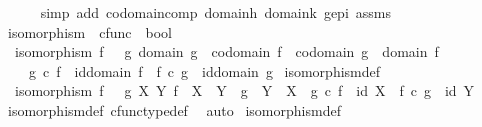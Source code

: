 \begin{isabellebody}
\ \ \ \ \isamarkupfalse%
\ {\isacharparenleft}{\kern0pt}simp\ add{\isacharcolon}{\kern0pt}\ codomain{\isacharunderscore}{\kern0pt}comp\ domain{\isacharunderscore}{\kern0pt}h\ domain{\isacharunderscore}{\kern0pt}k\ g{\isacharunderscore}{\kern0pt}epi\ assms{\isacharparenright}{\kern0pt}\isanewline
{}\isamarkupfalse%
%
\endisatagproof
{\isafoldproof}%
%
\isadelimproof
%
\endisadelimproof
%
\isadelimdocument
%
\endisadelimdocument
%
\isatagdocument
%
\isamarkuptrue%
%
\endisatagdocument
{\isafolddocument}%
%
\isadelimdocument
%
\endisadelimdocument
{}\isamarkupfalse%
\ isomorphism\ {\isacharcolon}{\kern0pt}{\isacharcolon}{\kern0pt}\ {\isachardoublequoteopen}cfunc\ {\isasymRightarrow}\ bool{\isachardoublequoteclose}\ \isanewline
\ \ {\isachardoublequoteopen}isomorphism\ f\ {\isasymlongleftrightarrow}\ {\isacharparenleft}{\kern0pt}{\isasymexists}\ g{\isachardot}{\kern0pt}\ domain\ g\ {\isacharequal}{\kern0pt}\ codomain\ f\ {\isasymand}\ codomain\ g\ {\isacharequal}{\kern0pt}\ domain\ f\ {\isasymand}\ \isanewline
\ \ \ \ g\ {\isasymcirc}\isactrlsub c\ f\ {\isacharequal}{\kern0pt}\ id{\isacharparenleft}{\kern0pt}domain\ f{\isacharparenright}{\kern0pt}\ {\isasymand}\ f\ {\isasymcirc}\isactrlsub c\ g\ {\isacharequal}{\kern0pt}\ id{\isacharparenleft}{\kern0pt}domain\ g{\isacharparenright}{\kern0pt}{\isacharparenright}{\kern0pt}{\isachardoublequoteclose}\isanewline
\isanewline
{}\isamarkupfalse%
\ isomorphism{\isacharunderscore}{\kern0pt}def{}{\isacharcolon}{\kern0pt}\isanewline
\ \ {\isachardoublequoteopen}isomorphism\ f\ {\isasymlongleftrightarrow}\ {\isacharparenleft}{\kern0pt}{\isasymexists}\ g\ X\ Y{\isachardot}{\kern0pt}\ f\ {\isacharcolon}{\kern0pt}\ X\ {\isasymrightarrow}\ Y\ {\isasymand}\ g\ {\isacharcolon}{\kern0pt}\ Y\ {\isasymrightarrow}\ X\ {\isasymand}\ g\ {\isasymcirc}\isactrlsub c\ f\ {\isacharequal}{\kern0pt}\ id\ X\ {\isasymand}\ f\ {\isasymcirc}\isactrlsub c\ g\ {\isacharequal}{\kern0pt}\ id\ Y{\isacharparenright}{\kern0pt}{\isachardoublequoteclose}\isanewline
%
\isadelimproof
\ \ %
\endisadelimproof
%
\isatagproof
{}\isamarkupfalse%
\ isomorphism{\isacharunderscore}{\kern0pt}def\ cfunc{\isacharunderscore}{\kern0pt}type{\isacharunderscore}{\kern0pt}def\ \isamarkupfalse%
\ auto%
\endisatagproof
{\isafoldproof}%
%
\isadelimproof
\isanewline
%
\endisadelimproof
\isanewline
{}\isamarkupfalse%
\ isomorphism{\isacharunderscore}{\kern0pt}def{}{\isacharcolon}{\kern0pt}\isanewline

\end{isabellebody}
